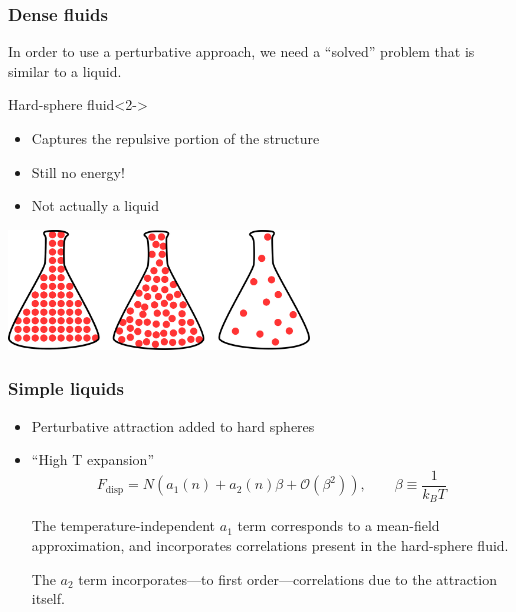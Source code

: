 
\begin{frame}
  \frametitle{Dense fluids}
  In order to use a perturbative approach, we need a ``solved''
  problem that is similar to a liquid.
  \begin{block}{Hard-sphere fluid}<2->
    \begin{itemize}
    \item Captures the repulsive portion of the structure
    \item Still no energy!
    \item Not actually a liquid
    \end{itemize}
    \begin{center}
      \includegraphics[width=8cm]{figs/hard-spheres}
    \end{center}
  \end{block}
\end{frame}

\begin{frame}
  \frametitle{Simple liquids}
  \begin{itemize}
  \item Perturbative attraction added to hard spheres
  \item ``High T expansion''
    \[
    F_\text{disp} = N\left(a_1(n) + a_2(n)\beta + \mathcal{O}(\beta^2)\right),
    \quad \quad \beta \equiv \frac{1}{k_BT}
    \]

    \vspace{1em} The temperature-independent $a_1$ term corresponds to
    a mean-field approximation, and incorporates correlations present
    in the hard-sphere fluid.
    \vspace{1em}

    The $a_2$ term incorporates---to first order---correlations due to
    the attraction itself.
  \end{itemize}
\end{frame}

